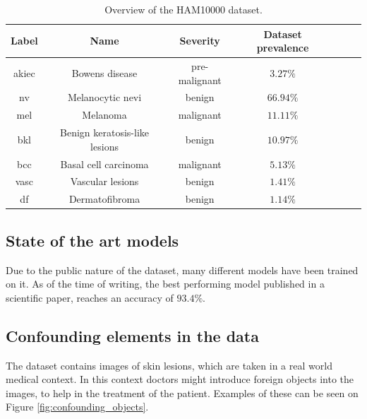 \documentclass[11pt,a4paper]{article}
\begin{document}
\begin{table}[ht]
\begin{center}
\begin{tabular}{|c|c|c|c|c|c|c|}
\hline
Label    & Name                          & Severity      & Dataset prevalence \\ \hline
akiec    & Bowens disease                & pre-malignant & $3.27\%$           \\ \hline
nv       & Melanocytic nevi              & benign        & $66.94\%$          \\ \hline
mel      & Melanoma                      & malignant     & $11.11\%$          \\ \hline
bkl      & Benign keratosis-like lesions & benign        & $10.97\%$          \\ \hline
bcc      & Basal cell carcinoma          & malignant     & $5.13\%$           \\ \hline
vasc     & Vascular lesions              & benign        & $1.41\%$           \\ \hline
df       & Dermatofibroma                & benign        & $1.14\%$           \\ \hline
\end{tabular}
\end{center}

\caption{Overview of the HAM10000 dataset.}
\label{table:ham10000}
\end{table}

\subsection{State of the art models}
Due to the public nature of the dataset, many different models have been trained on it.
As of the time of writing, the best performing model published in a scientific paper,
reaches an accuracy of $93.4\%$\cite{datta2021soft}.

\subsection{Confounding elements in the data}
The dataset contains images of skin lesions, which are taken in a real world medical context.
In this context doctors might introduce foreign objects into the images,
to help in the treatment of the patient.
Examples of these can be seen on Figure \ref{fig:confounding_objects}.
\end{document}

